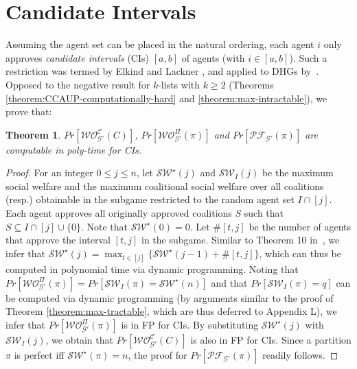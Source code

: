 \documentclass[letterpaper]{article} %
\newtheorem{theorem}{Theorem}
\begin{document}
\section{Candidate Intervals}
\label{sec:Candidate Intervals}
Assuming the agent set can be placed in the natural ordering, each agent $i$ only approves \textit{candidate intervals} (CIs) $[a, b]$ of agents (with $i \in [a, b]$). Such a restriction was termed by Elkind and Lackner , and applied to DHGs by~\cite{peters2016complexity}. %
Opposed to the negative result for $k$-lists with $k \geq 2$ (Theorems \ref{theorem:CCAUP-computationally-hard} and \ref{theorem:max-intractable}), we prove that:
\begin{theorem}
\label{theorem:CI-max-sw}
$Pr[\mathcal{WO}^{\mathcal{C}}_{\mathcal{G}'}(C)]$, $Pr[\mathcal{WO}_{\mathcal{G}'}^{\Pi}(\pi)]$ and $Pr[\mathcal{PF}_{\mathcal{G}'}(\pi)]$ are computable in poly-time for CIs.
\end{theorem}
\begin{proof}
For an integer $0 \leq j \leq n$, let $\mathcal{SW}^\star(j)$ and $\mathcal{SW}_I(j)$ be the maximum social welfare and the maximum coalitional social welfare over all coalitions (resp.) obtainable in the subgame restricted to the random agent set $I \cap [j]$. Each agent approves all originally approved coalitions $S$ such that $S \subseteq I \cap [j] \cup \{0\}$. Note that $\mathcal{SW}^\star(0) = 0$. Let $\#[t,j]$ be the number of agents that approve the interval $[t, j]$ in the subgame. Similar to Theorem 10 in~\cite{peters2016complexity}, we infer that $\mathcal{SW}^\star(j) = \max_{t \in [j]} \{\mathcal{SW}^\star(j-1) + \#[t,j]\}$, which can thus be computed in polynomial time via dynamic programming. Noting that $Pr[\mathcal{WO}_{\mathcal{G}'}^{\Pi}(\pi)] = Pr[\mathcal{SW}_I(\pi) = \mathcal{SW}^\star(n)]$ and that $Pr[\mathcal{SW}_I(\pi) = q]$ can be computed via dynamic programming (by arguments similar to the proof of Theorem \ref{theorem:max-tractable}, which are thus deferred to Appendix L), we infer that $Pr[\mathcal{WO}_{\mathcal{G}'}^{\Pi}(\pi)]$ is in FP for CIs. By substituting $\mathcal{SW}^\star(j)$ with $\mathcal{SW}_I(j)$, we obtain that $Pr[\mathcal{WO}^{\mathcal{C}}_{\mathcal{G}'}(C)]$ is also in FP for CIs. Since a partition $\pi$ is perfect iff $\mathcal{SW}^\star(\pi) = n$, the proof for $Pr[\mathcal{PF}_{\mathcal{G}'}(\pi)]$ readily follows.
\end{proof}
\end{document}
